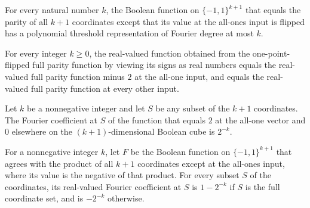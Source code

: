 \begin{theorem}
\label{FABL.onePointFlippedParity_isPolynomialThreshold}
\leanok
{}
For every natural number $k$, the Boolean function on $\{-1,1\}^{k+1}$ that equals the
parity of all $k+1$ coordinates except that its value at the all-ones input is flipped
has a polynomial threshold representation of Fourier degree at most $k$.
\end{theorem}

\begin{theorem}
\label{FABL.onePointFlippedParity_toReal}
\leanok
{}
For every integer $k\ge 0$, the real-valued function obtained from the one-point-flipped
full parity function by viewing its signs as real numbers equals the real-valued full
parity function minus $2$ at the all-one input, and equals the real-valued full parity
function at every other input.
\end{theorem}

\begin{theorem}
\label{FABL.fourierCoeff_two_mul_allOnePointMass}
\leanok
{}
Let $k$ be a nonnegative integer and let $S$ be any subset of the $k+1$ coordinates. The
Fourier coefficient at $S$ of the function that equals $2$ at the all-one vector and $0$
elsewhere on the $(k+1)$-dimensional Boolean cube is $2^{-k}$.
\end{theorem}

\begin{theorem}
\label{FABL.fourierCoeff_onePointFlippedParity}
\leanok
{}
For a nonnegative integer $k$, let $F$ be the Boolean function on $\{-1,1\}^{k+1}$
that agrees with the product of all $k+1$ coordinates except at the all-ones input,
where its value is the negative of that product. For every subset $S$ of the
coordinates, its real-valued Fourier coefficient at $S$ is $1-2^{-k}$ if $S$ is the full
coordinate set, and is $-2^{-k}$ otherwise.
\end{theorem}

